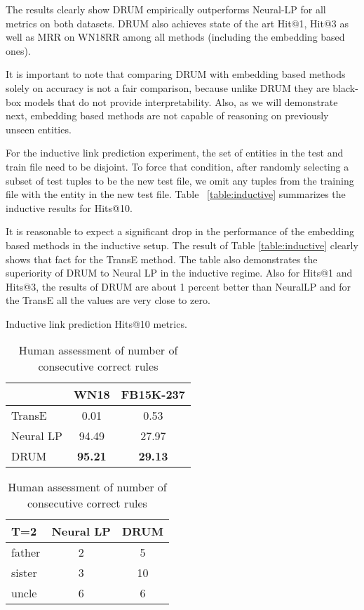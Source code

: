 \documentclass{article}
\begin{document}
The results clearly show DRUM empirically outperforms Neural-LP for all metrics on both datasets. 
DRUM also achieves state of the art Hit@1, Hit@3 as well as MRR on WN18RR among all methods (including the embedding based ones). 

It is important to note that comparing DRUM with embedding based methods solely on accuracy is not a fair comparison, because unlike DRUM they are black-box models that do not provide interpretability. Also, as we will demonstrate next, embedding based methods are not capable of reasoning on previously unseen entities.


For the inductive link prediction experiment, the set of entities in the test and train file need to be disjoint. To force that condition, after randomly selecting a subset of test tuples to be the new test file, we omit any tuples from the training file with the entity in the new test file. Table ~\ref{table:inductive} summarizes the inductive results for Hits@10. 

It is reasonable to expect a significant drop in the performance of the embedding based methods in the inductive setup. The result of Table \ref{table:inductive} clearly shows that fact for the TransE method. The table also demonstrates the superiority of DRUM to Neural LP in the inductive regime. Also for Hits@1 and Hits@3, the results of DRUM are about 1 percent better than NeuralLP and for the TransE all the values are very close to zero.
\begin{table}
\parbox{.45\linewidth}{
\centering
\caption{Inductive link prediction Hits@10 metrics.}
\label{table:inductive}
\begin{tabular}{l  c c}
\toprule
& WN18 & FB15K-237 \\
\midrule
TransE &0.01 & 0.53 \\
Neural LP &94.49  &27.97 \\
DRUM &\textbf{95.21}  &\textbf{29.13} \\
\bottomrule
\end{tabular}
}
\hfill
\parbox{.45\linewidth}{
\centering
\caption{Human assessment of number of consecutive
correct rules}
\label{tab:human_assessment}
\begin{tabular}{lcc}
\toprule
T=2        & Neural LP  & DRUM  \\ \midrule father  & 2       & 5    \\  sister  & 3       & 10    \\ uncle    & 6      & 6    \\  \bottomrule
\end{tabular}
}
\end{table}
\end{document}
